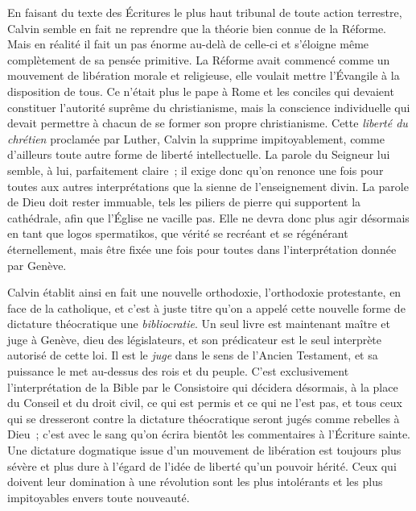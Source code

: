 \documentclass[french,twoside]{book} %
\newcommand{\astermono}{\medskip\centerline{\color{rubric}\large\selectfont{\syms ✻}}\medskip\par}%
\begin{document}
En faisant du texte des Écritures le plus haut tribunal de toute action terrestre, Calvin semble en fait ne reprendre que la théorie bien connue de la Réforme. Mais en réalité il fait un pas énorme au-delà de celle-ci et s’éloigne même complètement de sa pensée primitive. La Réforme avait commencé comme un mouvement de libération morale et religieuse, elle voulait mettre l’Évangile à la disposition de tous. Ce n’était plus le pape à Rome et les conciles qui devaient constituer l’autorité suprême du christianisme, mais la conscience individuelle qui devait permettre à chacun de se former son propre christianisme. Cette \emph{liberté du chrétien} proclamée par Luther, Calvin la supprime impitoyablement, comme d’ailleurs toute autre forme de liberté intellectuelle. La parole du Seigneur lui semble, à lui, parfaitement claire ; il exige donc qu’on renonce une fois pour toutes aux autres interprétations que la sienne de l’enseignement divin. La parole de Dieu doit rester immuable, tels les piliers de pierre qui supportent la cathédrale, afin que l’Église ne vacille pas. Elle ne devra donc plus agir désormais en tant que logos spermatikos, que vérité se recréant et se régénérant éternellement, mais être fixée une fois pour toutes dans l’interprétation donnée par Genève.\par
Calvin établit ainsi en fait une nouvelle orthodoxie, l’orthodoxie protestante, en face de la catholique, et c’est à juste titre qu’on a appelé cette nouvelle forme de dictature théocratique une \emph{bibliocratie}. Un seul livre est maintenant maître et juge à Genève, dieu des législateurs, et son prédicateur est le seul interprète autorisé de cette loi. Il est le \emph{juge} dans le sens de l’Ancien Testament, et sa puissance le met au-dessus des rois et du peuple. C’est exclusivement l’interprétation de la Bible par le Consistoire qui décidera désormais, à la place du Conseil et du droit civil, ce qui est permis et ce qui ne l’est pas, et tous ceux qui se dresseront contre la dictature théocratique seront jugés comme rebelles à Dieu ; c’est avec le sang qu’on écrira bientôt les commentaires à l’Écriture sainte. Une dictature dogmatique issue d’un mouvement de libération est toujours plus sévère et plus dure à l’égard de l’idée de liberté qu’un pouvoir hérité. Ceux qui doivent leur domination à une révolution sont les plus intolérants et les plus impitoyables envers toute nouveauté.\par

\astermono
\end{document}
